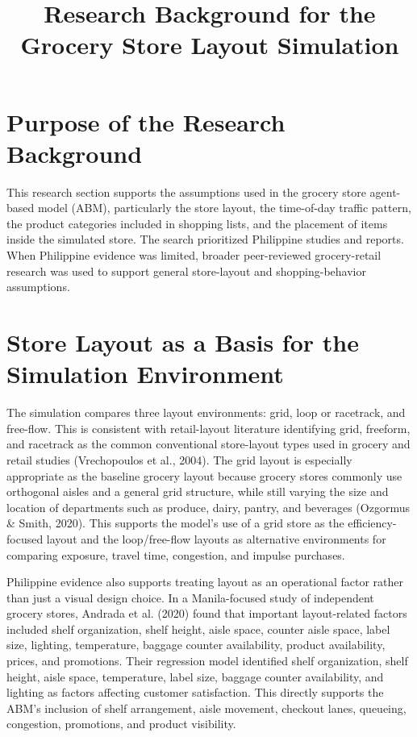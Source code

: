 \documentclass[12pt]{article}
\title{Research Background for the Grocery Store Layout Simulation}
\author{}
\date{}
\begin{document}
\maketitle

\section{Purpose of the Research Background}

This research section supports the assumptions used in the grocery store agent-based model (ABM), particularly the store layout, the time-of-day traffic pattern, the product categories included in shopping lists, and the placement of items inside the simulated store. The search prioritized Philippine studies and reports. When Philippine evidence was limited, broader peer-reviewed grocery-retail research was used to support general store-layout and shopping-behavior assumptions.

\section{Store Layout as a Basis for the Simulation Environment}

The simulation compares three layout environments: grid, loop or racetrack, and free-flow. This is consistent with retail-layout literature identifying grid, freeform, and racetrack as the common conventional store-layout types used in grocery and retail studies (Vrechopoulos et al., 2004). The grid layout is especially appropriate as the baseline grocery layout because grocery stores commonly use orthogonal aisles and a general grid structure, while still varying the size and location of departments such as produce, dairy, pantry, and beverages (Ozgormus \& Smith, 2020). This supports the model's use of a grid store as the efficiency-focused layout and the loop/free-flow layouts as alternative environments for comparing exposure, travel time, congestion, and impulse purchases.

Philippine evidence also supports treating layout as an operational factor rather than just a visual design choice. In a Manila-focused study of independent grocery stores, Andrada et al. (2020) found that important layout-related factors included shelf organization, shelf height, aisle space, counter aisle space, label size, lighting, temperature, baggage counter availability, product availability, prices, and promotions. Their regression model identified shelf organization, shelf height, aisle space, temperature, label size, baggage counter availability, and lighting as factors affecting customer satisfaction. This directly supports the ABM's inclusion of shelf arrangement, aisle movement, checkout lanes, queueing, congestion, promotions, and product visibility.
\end{document}
